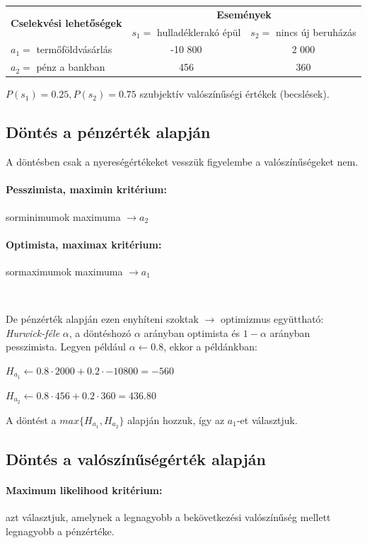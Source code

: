 \documentclass[a4paper,12pt]{article}
\begin{document}
\begin{center}
\begin{tabular}{l|c|c}
\multirow{2}{*}{\bf Cselekvési lehetőségek } &  \multicolumn{2}{c}{ \bf Események }\\

 & $s_1=$ hulladéklerakó épül & $s_2=$ nincs új beruházás \\
\hline
  $a_1=$ termőföldvásárlás & -10 800 & 2 000 \\
  $a_2=$ pénz a bankban & 456 & 360\\
\end{tabular}
\end{center}
$P(s_1) = 0.25 , P(s_2) = 0.75$ szubjektív valószínűségi értékek (becslések).

\subsection{Döntés a pénzérték alapján}
\label{susec:penzert}
A döntésben csak a nyereségértékeket vesszük figyelembe a valószínűségeket nem.
\paragraph{Pesszimista, maximin kritérium:}  sorminimumok maximuma $\rightarrow a_2$
\paragraph{Optimista, maximax kritérium:}  sormaximumok maximuma $\rightarrow a_1$

\

De pénzérték alapján ezen enyhíteni szoktak $\rightarrow$ optimizmus együttható: \emph{Hurwick-féle} $\alpha$, a döntéshozó $\alpha$ arányban optimista és $1-\alpha$ arányban pesszimista. Legyen például $\alpha \gets 0.8$, ekkor a példánkban: 
\begin{center}
$H_{a_1} \gets 0.8\cdot 2000 + 0.2\cdot -10800 = -560$

$H_{a_2} \gets 0.8\cdot 456 + 0.2\cdot 360 = 436.80$
\end{center}

A döntést a $max\{H_{a_1},H_{a_2}\}$ alapján hozzuk, így az $a_1$-et választjuk.

\subsection{Döntés a valószínűségérték alapján}
\label{susec:vaert}
\paragraph{Maximum likelihood kritérium: } azt választjuk, amelynek a legnagyobb a bekövetkezési valószínűség mellett legnagyobb a pénzértéke. 
\end{document}
